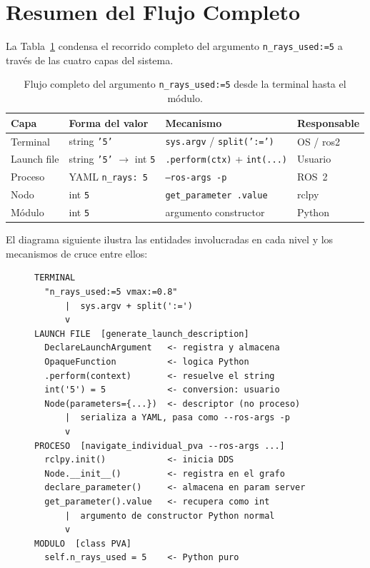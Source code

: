 \section{Resumen del Flujo Completo}

La Tabla~\ref{tab:resumen_flujo} condensa el recorrido completo del argumento \texttt{n\_rays\_used:=5} a través de las cuatro capas del sistema.

\begin{table}[H]
  \centering
  \caption{Flujo completo del argumento \texttt{n\_rays\_used:=5} desde la terminal hasta el módulo.}
  \label{tab:resumen_flujo}
  \begin{tabular}{p{1.6cm}p{1.8cm}p{2.2cm}p{1.8cm}}
    \toprule
    Capa & Forma del valor & Mecanismo & Responsable \\
    \midrule
    Terminal &
      string \texttt{'5'} &
      \texttt{sys.argv} / \texttt{split(':=')} &
      OS / ros2 \\[4pt]
    Launch file &
      string \texttt{'5'} $\to$ int \texttt{5} &
      \texttt{.perform(ctx)} + \texttt{int(...)} &
      Usuario \\[4pt]
    Proceso &
      YAML \texttt{n\_rays: 5} &
      \texttt{--ros-args -p} &
      ROS~2 \\[4pt]
    Nodo &
      int \texttt{5} &
      \texttt{get\_parameter .value} &
      rclpy \\[4pt]
    Módulo &
      int \texttt{5} &
      argumento constructor &
      Python \\
    \bottomrule
  \end{tabular}
\end{table}

El diagrama siguiente ilustra las entidades involucradas en cada nivel y los mecanismos de cruce entre ellos:

\begin{figure}[H]
\centering
\begin{minipage}{0.95\columnwidth}
\begin{lstlisting}[style=bash, caption={Diagrama de flujo Terminal $\to$ Módulo.}, label={lst:diagrama}]
TERMINAL
  "n_rays_used:=5 vmax:=0.8"
      |  sys.argv + split(':=')
      v
LAUNCH FILE  [generate_launch_description]
  DeclareLaunchArgument   <- registra y almacena
  OpaqueFunction          <- logica Python
  .perform(context)       <- resuelve el string
  int('5') = 5            <- conversion: usuario
  Node(parameters={...})  <- descriptor (no proceso)
      |  serializa a YAML, pasa como --ros-args -p
      v
PROCESO  [navigate_individual_pva --ros-args ...]
  rclpy.init()            <- inicia DDS
  Node.__init__()         <- registra en el grafo
  declare_parameter()     <- almacena en param server
  get_parameter().value   <- recupera como int
      |  argumento de constructor Python normal
      v
MODULO  [class PVA]
  self.n_rays_used = 5    <- Python puro
\end{lstlisting}
\end{minipage}
\end{figure}

